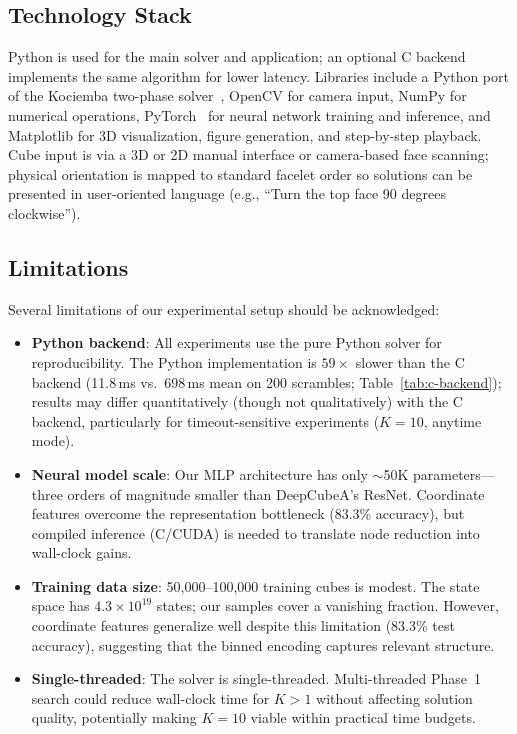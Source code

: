 \documentclass[conference]{IEEEtran}
\begin{document}
\subsection{Technology Stack}
Python is used for the main solver and application; an optional C backend implements the same algorithm for lower latency. Libraries include a Python port of the Kociemba two-phase solver~\cite{muodov}, OpenCV for camera input, NumPy for numerical operations, PyTorch~\cite{paszke2019} for neural network training and inference, and Matplotlib for 3D visualization, figure generation, and step-by-step playback. Cube input is via a 3D or 2D manual interface or camera-based face scanning; physical orientation is mapped to standard facelet order so solutions can be presented in user-oriented language (e.g., ``Turn the top face 90 degrees clockwise'').

\subsection{Limitations}
\label{sec:limitations}

Several limitations of our experimental setup should be acknowledged:

\begin{itemize}[leftmargin=*]
  \item \textbf{Python backend}: All experiments use the pure Python solver for reproducibility. The Python implementation is $59\times$ slower than the C backend (11.8\,ms vs.\ 698\,ms mean on 200 scrambles; Table~\ref{tab:c-backend}); results may differ quantitatively (though not qualitatively) with the C backend, particularly for timeout-sensitive experiments ($K{=}10$, anytime mode).
  
  \item \textbf{Neural model scale}: Our MLP architecture has only $\sim$50K parameters---three orders of magnitude smaller than DeepCubeA's ResNet. Coordinate features overcome the representation bottleneck (83.3\% accuracy), but compiled inference (C/CUDA) is needed to translate node reduction into wall-clock gains.
  
  \item \textbf{Training data size}: 50,000--100,000 training cubes is modest. The state space has $4.3 \times 10^{19}$ states; our samples cover a vanishing fraction. However, coordinate features generalize well despite this limitation (83.3\% test accuracy), suggesting that the binned encoding captures relevant structure.
  
  \item \textbf{Single-threaded}: The solver is single-threaded. Multi-threaded Phase~1 search could reduce wall-clock time for $K > 1$ without affecting solution quality, potentially making $K{=}10$ viable within practical time budgets.
\end{itemize}
\end{document}
